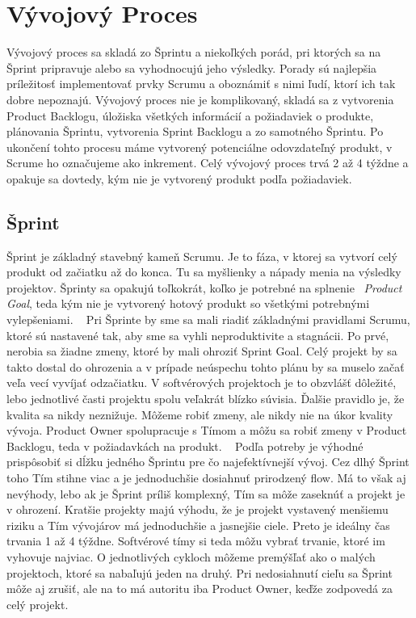 \documentclass[10pt,slovak,a4paper]{article}
\begin{document}
\section{Vývojový Proces} \label{proces} 

Vývojový proces sa skladá zo Šprintu a niekoľkých porád, pri ktorých sa na Šprint pripravuje alebo sa vyhodnocujú jeho výsledky. Porady sú najlepšia príležitosť implementovať prvky Scrumu a oboznámiť s nimi ľudí, ktorí ich tak dobre nepoznajú. Vývojový proces nie je komplikovaný, skladá sa z vytvorenia Product Backlogu, úložiska všetkých informácií a požiadaviek o produkte, plánovania Šprintu, vytvorenia Sprint Backlogu a zo samotného Šprintu. Po ukončení tohto procesu máme vytvorený potenciálne odovzdateľný produkt, v Scrume ho označujeme ako inkrement. Celý vývojový proces trvá 2 až 4 týždne a opakuje sa dovtedy, kým nie je vytvorený produkt podľa požiadaviek.~\cite{techScrum} 

\subsection{Šprint}

Šprint je základný stavebný kameň Scrumu. Je to fáza, v ktorej sa vytvorí celý produkt od začiatku až do konca. Tu sa myšlienky a nápady menia na výsledky projektov. Šprinty sa opakujú toľkokrát, koľko je potrebné na splnenie ~\emph{Product Goal}, teda kým nie je vytvorený hotový produkt so všetkými potrebnými vylepšeniami. ~\cite{schwaber2020scrum}
Pri Šprinte by sme sa mali riadiť základnými pravidlami Scrumu, ktoré sú nastavené tak, aby sme sa vyhli neproduktivite a stagnácii. Po prvé, nerobia sa žiadne zmeny, ktoré by mali ohroziť Sprint Goal. Celý projekt by sa takto dostal do ohrozenia a v prípade neúspechu tohto plánu by sa muselo začať veľa vecí vyvíjať odzačiatku. V softvérových projektoch je to obzvlášť dôležité, lebo jednotlivé časti projektu spolu veľakrát blízko súvisia. Ďalšie pravidlo je, že kvalita sa nikdy neznižuje. Môžeme robiť zmeny, ale nikdy nie na úkor kvality vývoja. Product Owner spolupracuje s Tímom a môžu sa robiť zmeny v Product Backlogu, teda v požiadavkách na produkt. ~\cite{schwaber2020scrum}
Podľa potreby je výhodné prispôsobiť si dĺžku jedného Šprintu pre čo najefektívnejší vývoj. Cez dlhý Šprint toho Tím stihne viac a je jednoduchšie dosiahnuť prirodzený flow. Má to však aj nevýhody, lebo ak je Šprint príliš komplexný, Tím sa môže zaseknúť a projekt je v ohrození. Kratšie projekty majú výhodu, že je projekt vystavený menšiemu riziku a Tím vývojárov má jednoduchšie a jasnejšie ciele. Preto je ideálny čas trvania 1 až 4 týždne. Softvérové tímy si teda môžu vybrať trvanie, ktoré im vyhovuje najviac. O jednotlivých cykloch môžeme premýšľať ako o malých projektoch, ktoré sa nabaľujú jeden na druhý. Pri nedosiahnutí cieľu sa Šprint môže aj zrušiť, ale na to má autoritu iba Product Owner, keďže zodpovedá za celý projekt. ~\cite{schwaber2020scrum}
\end{document}
